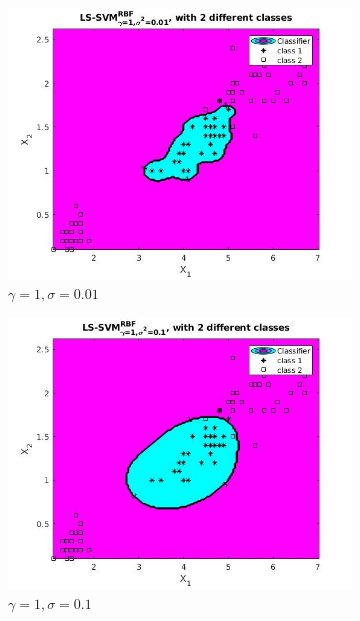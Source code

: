 \documentclass{article}
\begin{document}
    \begin{figure}[]
        \begin{subfigure}{0.50\linewidth}
            \includegraphics[width=\linewidth]{RBFgam1sig001}
            \caption{$\gamma=1, \sigma=0.01$}
        \end{subfigure}
        \begin{subfigure}{0.50\linewidth}
            \includegraphics[width=\linewidth]{RBFgam1sig01}
            \caption{$\gamma=1, \sigma=0.1$}
        \end{subfigure}
        \begin{subfigure}{0.50\linewidth}

\end{subfigure}
\end{figure}
\end{document}
